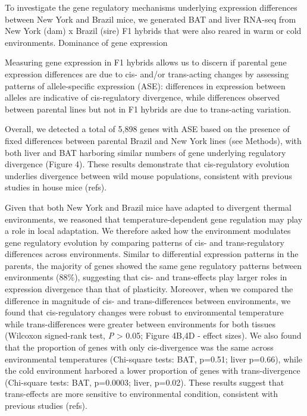 \documentclass[9pt,twocolumn,twoside,lineno]{pnas-new}
\begin{document}
To investigate the gene regulatory mechanisms underlying expression
differences between New York and Brazil mice, we generated BAT and liver
RNA-seq from New York (dam) x Brazil (sire) F1 hybrids that were also
reared in warm or cold environments. Dominance of gene expression

Measuring gene expression in F1 hybrids allows us to discern if parental
gene expression differences are due to cis- and/or trans-acting changes
by assessing patterns of allele-specific expression (ASE): differences
in expression between alleles are indicative of cis-regulatory
divergence, while differences observed between parental lines but not in
F1 hybrids are due to trans-acting variation.

Overall, we detected a total of 5,898 genes with ASE based on the
presence of fixed differences between parental Brazil and New York lines
(see Methods), with both liver and BAT harboring similar numbers of gene
underlying regulatory divergence (Figure 4). These results demonstrate
that cis-regulatory evolution underlies divergence between wild mouse
populations, consistent with previous studies in house mice (refs).

Given that both New York and Brazil mice have adapted to divergent
thermal environments, we reasoned that temperature-dependent gene
regulation may play a role in local adaptation. We therefore asked how
the environment modulates gene regulatory evolution by comparing
patterns of cis- and trans-regulatory differences across environments.
Similar to differential expression patterns in the parents, the majority
of genes showed the same gene regulatory patterns between environments
(88\%), suggesting that cis- and trans-effects play larger roles in
expression divergence than that of plasticity. Moreover, when we
compared the difference in magnitude of cis- and trans-differences
between environments, we found that cis-regulatory changes were robust
to environmental temperature while trans-differences were greater
between environments for both tissues (Wilcoxon signed-rank test,
\emph{P} \textgreater{} 0.05; Figure 4B,4D - effect sizes). We also
found that the proportion of genes with only cis-divergence was the same
across environmental temperatures (Chi-square tests: BAT, p=0.51; liver
p=0.66), while the cold environment harbored a lower proportion of genes
with trans-divergence (Chi-square tests: BAT, p=0.0003; liver, p=0.02).
These results suggest that trans-effects are more sensitive to
environmental condition, consistent with previous studies (refs).
\end{document}
